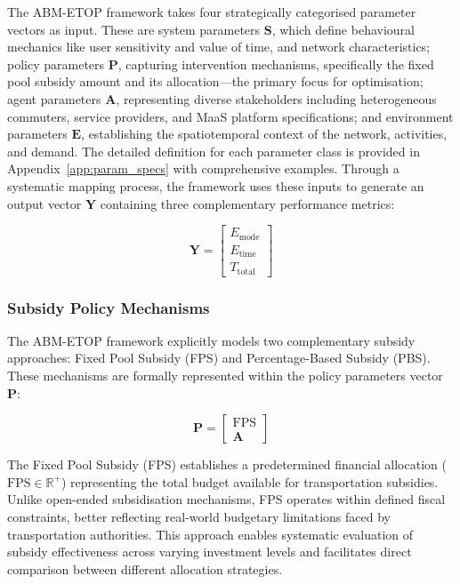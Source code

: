 \documentclass[a4paper,fleqn]{cas-sc}
\begin{document}
The ABM-ETOP framework takes four strategically categorised parameter vectors as input. These are system parameters $\mathbf{S}$, which define behavioural mechanics like user sensitivity and value of time, and network characteristics; policy parameters $\mathbf{P}$, capturing intervention mechanisms, specifically the fixed pool subsidy amount and its allocation—the primary focus for optimisation; agent parameters $\mathbf{A}$, representing diverse stakeholders including heterogeneous commuters, service providers, and MaaS platform specifications; and environment parameters $\mathbf{E}$, establishing the spatiotemporal context of the network, activities, and demand. The detailed definition for each parameter class is provided in Appendix~\ref{app:param_specs} with comprehensive examples. 
Through a systematic mapping process, the framework uses these inputs to generate an output vector $\mathbf{Y}$ containing three complementary performance metrics:

\begin{equation}
\mathbf{Y} = \begin{bmatrix} E_{\text{mode}} \\ E_{\text{time}} \\ T_{\text{total}} \end{bmatrix}
\end{equation}
\subsubsection{Subsidy Policy Mechanisms}
The ABM-ETOP framework explicitly models two complementary subsidy approaches: Fixed Pool Subsidy (FPS) and Percentage-Based Subsidy (PBS). These mechanisms are formally represented within the policy parameters vector $\mathbf{P}$:

\begin{equation}
\mathbf{P} = \begin{bmatrix} \text{FPS} \\ \mathbf{A} \end{bmatrix}
\end{equation}

The Fixed Pool Subsidy (FPS) establishes a predetermined financial allocation ($\text{FPS} \in \mathbb{R}^+$) representing the total budget available for transportation subsidies. Unlike open-ended subsidisation mechanisms, FPS operates within defined fiscal constraints, better reflecting real-world budgetary limitations faced by transportation authorities. This approach enables systematic evaluation of subsidy effectiveness across varying investment levels and facilitates direct comparison between different allocation strategies.
\end{document}
